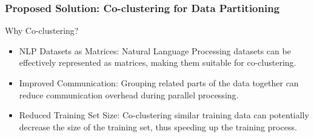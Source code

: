 \documentclass[serif]{beamer}
\begin{document}

\begin{frame}
    \frametitle{Proposed Solution: Co-clustering for Data Partitioning}
    \begin{block}{Why Co-clustering?}
        \begin{itemize}
            \item NLP Datasets as Matrices: Natural Language Processing datasets can be effectively represented as matrices, making them suitable for co-clustering.
            \item Improved Communication: Grouping related parts of the data together can reduce communication overhead during parallel processing.
            \item Reduced Training Set Size: Co-clustering similar training data can potentially decrease the size of the training set, thus speeding up the training process.
        \end{itemize}
    \end{block}
\end{frame}
\end{document}
